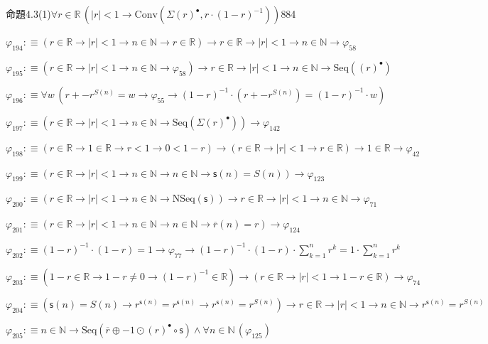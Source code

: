 \begin{fullproof}{命題4.3(1)}{$\forall r \in \mathbb{R}\,(\lvert r \rvert < 1 \to \mathrm{Conv}(\Sigma {(r)^{\bullet}},r \cdot (1 - r)^{-1}))$}{884}
\begin{abbrevlist}
\item $\varphi_{194} :\equiv (r \in \mathbb{R} \to \lvert r \rvert < 1 \to n \in \mathbb{N} \to r \in \mathbb{R}) \to r \in \mathbb{R} \to \lvert r \rvert < 1 \to n \in \mathbb{N} \to \varphi_{58}$
\item $\varphi_{195} :\equiv (r \in \mathbb{R} \to \lvert r \rvert < 1 \to n \in \mathbb{N} \to \varphi_{58}) \to r \in \mathbb{R} \to \lvert r \rvert < 1 \to n \in \mathbb{N} \to \mathrm{Seq}({(r)^{\bullet}})$
\item $\varphi_{196} :\equiv \forall w\,(r + -{{r}^{S(n)}} = w \to \varphi_{55} \to (1 - r)^{-1} \cdot (r + -{{r}^{S(n)}}) = (1 - r)^{-1} \cdot w)$
\item $\varphi_{197} :\equiv (r \in \mathbb{R} \to \lvert r \rvert < 1 \to n \in \mathbb{N} \to \mathrm{Seq}(\Sigma {(r)^{\bullet}})) \to \varphi_{142}$
\item $\varphi_{198} :\equiv (r \in \mathbb{R} \to 1 \in \mathbb{R} \to r < 1 \to 0 < 1 - r) \to (r \in \mathbb{R} \to \lvert r \rvert < 1 \to r \in \mathbb{R}) \to 1 \in \mathbb{R} \to \varphi_{42}$
\item $\varphi_{199} :\equiv (r \in \mathbb{R} \to \lvert r \rvert < 1 \to n \in \mathbb{N} \to n \in \mathbb{N} \to \mathsf{s}(n) = S(n)) \to \varphi_{123}$
\item $\varphi_{200} :\equiv (r \in \mathbb{R} \to \lvert r \rvert < 1 \to n \in \mathbb{N} \to \mathrm{NSeq}(\mathsf{s})) \to r \in \mathbb{R} \to \lvert r \rvert < 1 \to n \in \mathbb{N} \to \varphi_{71}$
\item $\varphi_{201} :\equiv (r \in \mathbb{R} \to \lvert r \rvert < 1 \to n \in \mathbb{N} \to n \in \mathbb{N} \to \overline{r}(n) = r) \to \varphi_{124}$
\item $\varphi_{202} :\equiv (1 - r)^{-1} \cdot (1 - r) = 1 \to \varphi_{77} \to (1 - r)^{-1} \cdot (1 - r) \cdot {\textstyle\sum_{k=1}^{n} {{r}^{k}}} = 1 \cdot {\textstyle\sum_{k=1}^{n} {{r}^{k}}}$
\item $\varphi_{203} :\equiv (1 - r \in \mathbb{R} \to 1 - r \neq 0 \to (1 - r)^{-1} \in \mathbb{R}) \to (r \in \mathbb{R} \to \lvert r \rvert < 1 \to 1 - r \in \mathbb{R}) \to \varphi_{74}$
\item $\varphi_{204} :\equiv (\mathsf{s}(n) = S(n) \to {{r}^{\mathsf{s}(n)}} = {{r}^{\mathsf{s}(n)}} \to {{r}^{\mathsf{s}(n)}} = {{r}^{S(n)}}) \to r \in \mathbb{R} \to \lvert r \rvert < 1 \to n \in \mathbb{N} \to {{r}^{\mathsf{s}(n)}} = {{r}^{S(n)}}$
\item $\varphi_{205} :\equiv n \in \mathbb{N} \to \mathrm{Seq}(\overline{r} \oplus -1 \odot {(r)^{\bullet}} \circ \mathsf{s}) \land \forall n \in \mathbb{N}\,(\varphi_{125})$

\end{abbrevlist}
\end{fullproof}
